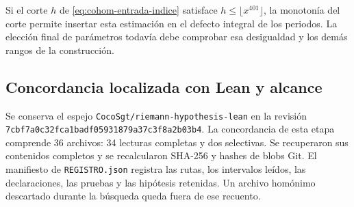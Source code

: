 Si el corte $h$ de \eqref{eq:cohom-entrada-indice}
satisface $h\le\lfloor x^{401}\rfloor$, la monotonía
del corte permite insertar esta estimación en el
defecto integral de los periodos.
La elección final de parámetros todavía debe comprobar
esa desigualdad y los demás rangos de la construcción.

\subsection{Concordancia localizada con Lean y alcance}

\begingroup
\raggedright
Se conserva el espejo
\texttt{CocoSgt/riemann-hypothesis-lean} en la revisión
\texttt{7cbf7a0c32fca1badf05931879a37c3f8a2b03b4}.
La concordancia de esta etapa comprende 36 archivos:
34 lecturas completas y dos selectivas.
Se recuperaron sus contenidos completos y se
recalcularon SHA-256 y hashes de blobs Git.
El manifiesto de \texttt{REGISTRO.json} registra las
rutas, los intervalos leídos, las declaraciones,
las pruebas y las hipótesis retenidas.
Un archivo homónimo descartado durante la búsqueda
queda fuera de ese recuento.

